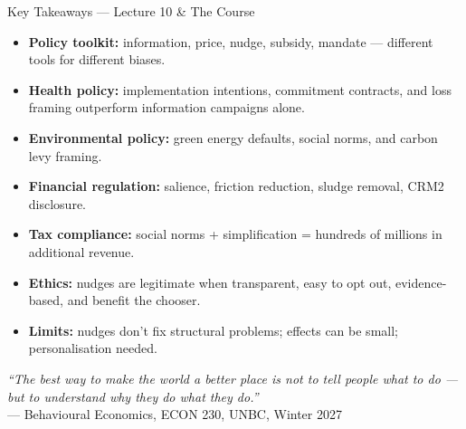 \documentclass[aspectratio=169]{beamer}
\begin{document}
\begin{frame}{Key Takeaways --- Lecture 10 \& The Course}
\begin{itemize}
  \item[\textcolor{beteal}{\checkmark}] \textbf{Policy toolkit:} information, price, nudge, subsidy, mandate --- different tools for different biases.
  \item[\textcolor{beteal}{\checkmark}] \textbf{Health policy:} implementation intentions, commitment contracts, and loss framing outperform information campaigns alone.
  \item[\textcolor{beteal}{\checkmark}] \textbf{Environmental policy:} green energy defaults, social norms, and carbon levy framing.
  \item[\textcolor{beteal}{\checkmark}] \textbf{Financial regulation:} salience, friction reduction, sludge removal, CRM2 disclosure.
  \item[\textcolor{beteal}{\checkmark}] \textbf{Tax compliance:} social norms + simplification = hundreds of millions in additional revenue.
  \item[\textcolor{beteal}{\checkmark}] \textbf{Ethics:} nudges are legitimate when transparent, easy to opt out, evidence-based, and benefit the chooser.
  \item[\textcolor{beteal}{\checkmark}] \textbf{Limits:} nudges don't fix structural problems; effects can be small; personalisation needed.
\end{itemize}
\medskip
\centering \textit{``The best way to make the world a better place is not to tell people what to do --- but to understand why they do what they do.''}\\
\small --- Behavioural Economics, ECON 230, UNBC, Winter 2027
\end{frame}
\end{document}
